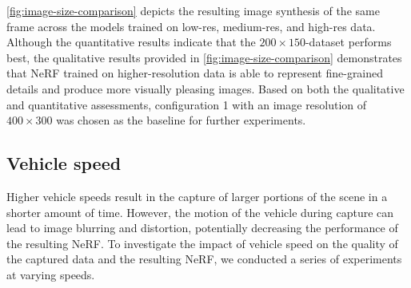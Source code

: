 \autoref{fig:image-size-comparison} depicts the resulting image synthesis of the same frame across the models trained on low-res, medium-res, and high-res data. Although the quantitative results indicate that the $200 \times 150$-dataset performs best, the qualitative results provided in \autoref{fig:image-size-comparison} demonstrates that NeRF trained on higher-resolution data is able to represent fine-grained details and produce more visually pleasing images. Based on both the qualitative and quantitative assessments, configuration 1 with an image resolution of $400 \times 300$ was chosen as the baseline for further experiments.










\subsection{Vehicle speed} \label{sec:exp-speed}
Higher vehicle speeds result in the capture of larger portions of the scene in a shorter amount of time. However, the motion of the vehicle during capture can lead to image blurring and distortion, potentially decreasing the performance of the resulting NeRF. To investigate the impact of vehicle speed on the quality of the captured data and the resulting NeRF, we conducted a series of experiments at varying speeds.



